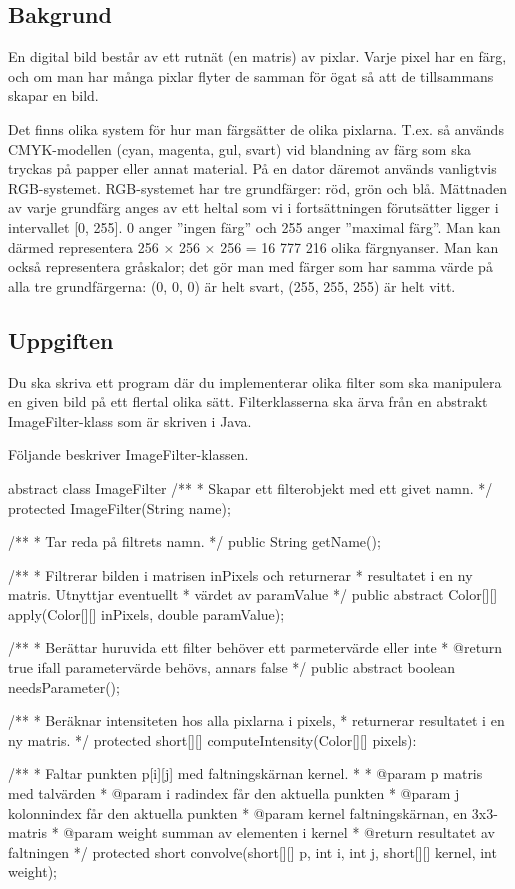

\subsection{Bakgrund}

En digital bild består av ett rutnät (en matris) av pixlar. Varje pixel har en färg, och om man har många pixlar flyter de samman för ögat så att de tillsammans skapar en bild.

Det finns olika system för hur man färgsätter de olika pixlarna. T.ex. så används CMYK-modellen (cyan, magenta, gul, svart) vid blandning av färg som ska tryckas på papper eller annat material. På en dator däremot används vanligtvis RGB-systemet. RGB-systemet har tre grundfärger: röd, grön och blå. Mättnaden av varje grundfärg anges av ett heltal som vi i fortsättningen förutsätter ligger i intervallet [0, 255]. 0 anger ”ingen färg” och 255 anger ”maximal färg”. Man kan därmed representera 256 × 256 × 256 = 16 777 216 olika färgnyanser. Man kan också representera gråskalor; det gör man med färger som har samma värde på alla tre grundfärgerna: (0, 0, 0) är helt svart, (255, 255, 255) är helt vitt.


\subsection{Uppgiften}
Du ska skriva ett program där du implementerar olika filter som ska manipulera en given bild på ett flertal olika sätt. Filterklasserna ska ärva från en abstrakt ImageFilter-klass som är skriven i Java.

Följande beskriver ImageFilter-klassen.

\begin{JavaSpec}{abstract class ImageFilter}
/**
 * Skapar ett filterobjekt med ett givet namn.
 */
protected ImageFilter(String name);

/**
 * Tar reda på filtrets namn.
 */
public String getName();

/**
 * Filtrerar bilden i matrisen inPixels och returnerar
 * resultatet i en ny matris. Utnyttjar eventuellt 
 * värdet av paramValue
 */
public abstract Color[][] apply(Color[][] inPixels,
				 double paramValue);

/**
 * Berättar huruvida ett filter behöver ett parmetervärde eller inte
 * @return true ifall parametervärde behövs, annars false
 */
public abstract boolean needsParameter();

/**
 * Beräknar intensiteten hos alla pixlarna i pixels,
 * returnerar resultatet i en ny matris.
 */
protected short[][] computeIntensity(Color[][] pixels):

/**
 * Faltar punkten p[i][j] med faltningskärnan kernel.
 * 
 * @param p 		matris med talvärden
 * @param i 		radindex får den aktuella punkten
 * @param j 		kolonnindex får den aktuella punkten
 * @param kernel	faltningskärnan, en 3x3-matris
 * @param weight	summan av elementen i kernel
 * @return 		resultatet av faltningen
 */
protected short convolve(short[][] p, int i, int j, 
			short[][] kernel, int weight);
\end{JavaSpec}

